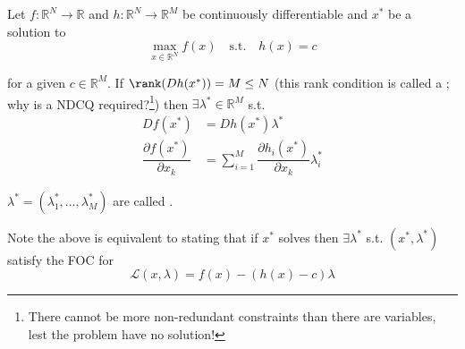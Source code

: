 \documentclass{article}
\begin{document}
\begin{theorem}\label{thm:lecture5_lagrangian}
  Let $f: \mathbb{R}^N \to \mathbb{R}$ and  $h: \mathbb{R}^N \to \mathbb{R}^M$ be  continuously differentiable and $x^*$ be a solution to
  \begin{equation}
    \max_{x \in \mathbb{R}^N} f(x)
    \quad\text{s.t.}\quad
    h(x) = c
    \label{eq:lecture5_max_lagrangian_theorem}
  \end{equation}

  for a given $c \in \mathbb{R}^M$. If $\rank(Dh(x^*)) = M \le N$ (this rank condition is called a ;  why is a NDCQ required?\footnote{There cannot be more non-redundant constraints than there are variables, lest the problem have no solution!}) then $\exists \lambda^* \in \mathbb{R}^M$ s.t.
  \begin{align*}
    Df(x^*)
    & =
    Dh(x^*) \lambda^*
    \\
    \dfrac{\partial f(x^*)}{\partial x_k}
    & =
    \sum^{M}_{i = 1}
    \dfrac{\partial h_i(x^*)}{\partial x_k} \lambda_i^*
  \end{align*}

  $\lambda^* = (\lambda_1^*, \ldots, \lambda_M^*)$ are called .
\end{theorem}

Note the above is equivalent to stating that if $x^*$ solves  then $\exists \lambda^*$ s.t. $(x^*, \lambda^*)$ satisfy the FOC for
\begin{equation}
  \mathcal{L}(x, \lambda)
  =
  f(x) - (h(x) - c) \lambda
\end{equation}
\end{document}
